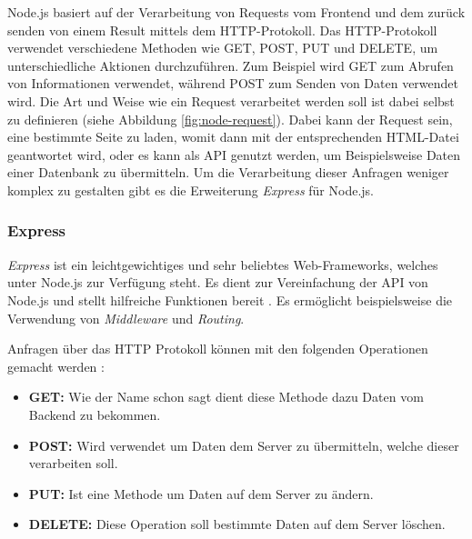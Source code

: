 \documentclass[a4paper,12pt]{report}
\begin{document}
Node.js basiert auf der Verarbeitung von Requests vom Frontend und dem zurück senden von einem Result mittels dem HTTP-Protokoll. Das HTTP-Protokoll verwendet verschiedene Methoden wie GET, POST, PUT und DELETE, um unterschiedliche Aktionen durchzuführen. Zum Beispiel wird GET zum Abrufen von Informationen verwendet, während POST zum Senden von Daten verwendet wird. Die Art und Weise wie ein Request verarbeitet werden soll ist dabei selbst zu definieren (siehe Abbildung \ref{fig:node-request}). Dabei kann der Request sein, eine bestimmte Seite zu laden, womit dann mit der entsprechenden HTML-Datei geantwortet wird, oder es kann als API genutzt werden, um Beispielsweise Daten einer Datenbank zu übermitteln. Um die Verarbeitung dieser Anfragen weniger komplex zu gestalten gibt es die Erweiterung \textit{Express} für Node.js.


\subsubsection{Express}
\label{sec:express}
\textit{Express} ist ein leichtgewichtiges und sehr beliebtes Web-Frameworks, welches unter Node.js zur Verfügung steht. Es dient zur Vereinfachung der API von Node.js und stellt hilfreiche Funktionen bereit \cite{expressbook}. Es ermöglicht beispielsweise die Verwendung von \textit{Middleware} und \textit{Routing}.

Anfragen über das HTTP Protokoll können mit den folgenden Operationen gemacht werden \cite{expressbook}:

\begin{itemize}
\item \textbf{GET:} Wie der Name schon sagt dient diese Methode dazu Daten vom Backend zu bekommen.
\item \textbf{POST:} Wird verwendet um Daten dem Server zu übermitteln, welche dieser verarbeiten soll.
\item \textbf{PUT:} Ist eine Methode um Daten auf dem Server zu ändern.
\item \textbf{DELETE:} Diese Operation soll bestimmte Daten auf dem Server löschen.
\end{itemize}
\end{document}
